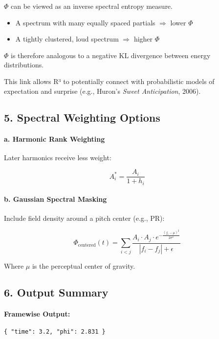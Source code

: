 $\Phi$ can be viewed as an inverse spectral entropy measure.

\begin{itemize}
    \item A spectrum with many equally spaced partials $\Rightarrow$ lower $\Phi$
    \item A tightly clustered, loud spectrum $\Rightarrow$ higher $\Phi$
\end{itemize}

$\Phi$ is therefore analogous to a negative KL divergence between energy distributions.

This link allows R³ to potentially connect with probabilistic models of expectation and surprise (e.g., Huron’s \textit{Sweet Anticipation}, 2006).

\subsection*{5. Spectral Weighting Options}

\paragraph{a. Harmonic Rank Weighting}

Later harmonics receive less weight:

\[
A_i^* = \frac{A_i}{1 + h_i}
\]

\paragraph{b. Gaussian Spectral Masking}

Include field density around a pitch center (e.g., PR):

\[
\Phi_{\text{centered}}(t) = \sum_{i<j} \frac{A_i \cdot A_j \cdot e^{-\frac{(f_i - \mu)^2}{2\sigma^2}}}{|f_i - f_j| + \epsilon}
\]

Where $\mu$ is the perceptual center of gravity.

\subsection*{6. Output Summary}

\paragraph{Framewise Output:}

\begin{verbatim}
{ "time": 3.2, "phi": 2.831 }
\end{verbatim}

